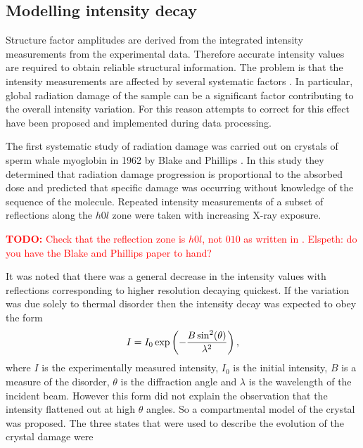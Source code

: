     \subsection{Modelling intensity decay}
    \label{sub:Modelling intensity decay}
        Structure factor amplitudes are derived from the integrated intensity measurements from the experimental data.
        Therefore accurate intensity values are required to obtain reliable structural information.
		The problem is that the intensity measurements are affected by several systematic factors \cite{evans2005}.
		In particular, global radiation damage of the sample can be a significant factor contributing to the overall intensity variation.
		For this reason attempts to correct for this effect have been proposed and implemented during data processing.

        The first systematic study of radiation damage was carried out on crystals of sperm whale myoglobin in 1962 by Blake and Phillips \cite{blake1962}.
        In this study they determined that radiation damage progression is proportional to the absorbed dose and predicted that specific damage was occurring without knowledge of the sequence of the molecule.
        Repeated intensity measurements of a subset of reflections along the $h0l$ zone were taken with increasing X-ray exposure.
        \textcolor{red}{
            \begin{myenumerate}
                \item \hypertarget{todo:checkrefzone}{\textbf{TODO:} Check that the reflection zone is $h0l$, not $010$ as written in \cite{south2007}. Elspeth: do you have the Blake and Phillips paper to hand?}
            \end{myenumerate}
        }
        It was noted that there was a general decrease in the intensity values with reflections corresponding to higher resolution decaying quickest.
        If the variation was due solely to thermal disorder then the intensity decay was expected to obey the form
        \begin{equation}
            I = I_0 \exp\left(-\frac{B \sin^2(\theta)}{\lambda^2} \right),
        \end{equation}
        where $I$ is the experimentally measured intensity, $I_0$ is the initial intensity, $B$ is a measure of the disorder, $\theta$ is the diffraction angle and $\lambda$ is the wavelength of the incident beam.
        However this form did not explain the observation that the intensity flattened out at high $\theta$ angles.
        So a compartmental model of the crystal was proposed. The three states that were used to describe the evolution of the crystal damage were
